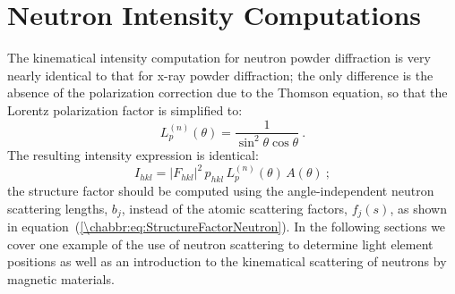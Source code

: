 %


\section{Neutron Intensity Computations}\label{\chabbr:sec:ncomputations}
The kinematical intensity computation for neutron powder diffraction is very nearly identical to that for x-ray powder diffraction; the only difference is the absence of the polarization correction due to the Thomson equation, so that the Lorentz polarization factor is simplified to:
\begin{equation}
	L^{(n)}_p(\theta) =  \frac{1}{\sin^2\theta\cos\theta}\ .\label{\chabbr:eq:neutronLPF}
\end{equation}
The resulting intensity expression is identical:
\begin{equation}
	I_{hkl} = \vert F_{hkl}\vert^2\, p_{hkl}\, L^{(n)}_p(\theta)\, A(\theta)\ ;\label{\chabbr:eq:neutronIhkl}
\end{equation}
the structure factor should be computed using the angle-independent neutron scattering lengths, $b_j$, instead of the atomic scattering factors, $f_j(s)$, as shown in equation~(\ref{\chabbr:eq:StructureFactorNeutron}). In the following sections we cover one example of the use of neutron scattering to determine light element positions as well as an introduction to the kinematical scattering of neutrons by magnetic materials.

